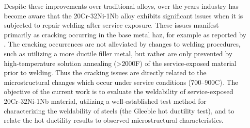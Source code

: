 Despite these improvements over traditional alloys, over the years industry has become aware \cite{api_942_2014} that the 20Cr-32Ni-1Nb alloy exhibits significant issues when it is subjected to repair welding after service exposure. These issues manifest primarily as cracking occurring in the base metal \gls{haz}, for example as reported by \citet{hoffman_weld_1998}. The cracking occurrences are not alleviated by changes to welding procedures, such as utilizing a more ductile filler metal, but rather are only prevented by high-temperature solution annealing (>2000\textdegree{}F) of the service-exposed material prior to welding. Thus the cracking issues are directly related to the microstructural changes which occur under service conditions (700--900C). The objective of the current work is to evaluate the weldability of service-exposed 20Cr-32Ni-1Nb material, utilizing a well-established test method for characterizing the weldability of steels (the Gleeble hot ductility test), and to relate the hot ductility results to observed microstructural characteristics.












